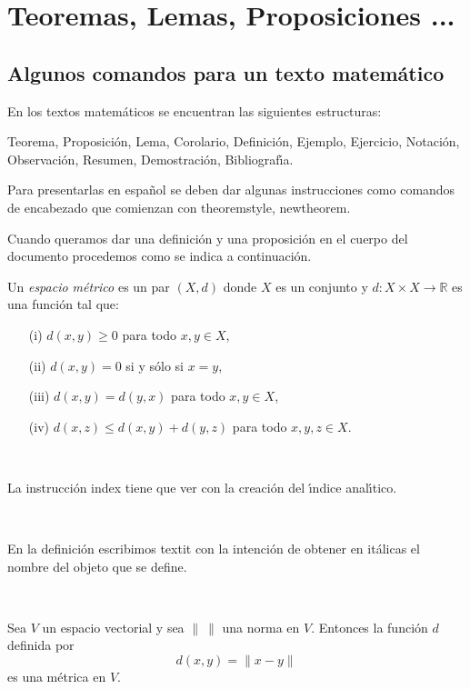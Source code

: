 \chapter{Teoremas, Lemas, Proposiciones ... }

\section{Algunos comandos para un texto matem\'atico}

En los textos matem\'aticos se encuentran las siguientes estructuras:

Teorema, Proposici\'on, Lema, Corolario, Definici\'on, Ejemplo, Ejercicio, Notaci\'on,
Observaci\'on, Resumen, Demostraci\'on, Bibliograf\'{\i}a.

Para presentarlas en espa\~nol se deben dar algunas instrucciones como comandos de encabezado
que comienzan con theoremstyle, newtheorem.

Cuando queramos dar una definici\'on y una proposici\'on en el cuerpo del documento
procedemos como se indica a continuaci\'on.

\begin{definition} 
Un \textit{espacio m\'etrico} es un par $(X, d)$ donde $X$ es un conjunto y $d: X \times X
\rightarrow {\mathbb R}$ es una funci\'on tal que:
\begin{itemize}
\item[(i)]   $d(x, y) \geq 0$  para todo $x, y \in X$, \item[(ii)]  $d(x, y) = 0$ si y s\'olo
si $x = y$, \item[(iii)]  $d(x, y) = d(y, x)$  para todo $x, y \in X$, \item[(iv)]  $d(x, z)
\leq d(x, y) + d(y, z)$  para todo $x, y, z \in X$.
\end{itemize}
\end{definition}

\

La instrucci\'on index tiene que ver con la creaci\'on del \'{\i}ndice anal\'{\i}tico.

\

En la definici\'on escribimos textit con la intenci\'on de obtener en it\'alicas el nombre
del objeto que se define.

\

\begin{proposition} \label{norma-met}
Sea $V$ un espacio vectorial y sea $\parallel \: \parallel$ una norma en $V$. Entonces  la
funci\'on $d$ definida por $$d(x,y) = \parallel x - y \parallel$$ es una m\'etrica en $V$.
\end{proposition}

